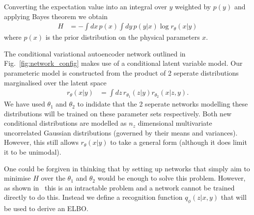 \documentclass[%
showpacs,
 amsmath,amssymb,
 aps,
 twocolumn,
 prl,
 reprint,
floatfix,
]{revtex4-1}
\begin{document}
Converting the expectation value into an integral over $y$ weighted by $p(y)$
and applying Bayes theorem we obtain
%
\begin{align}\label{eq:cost1}
H &= -\int dx\,p(x)\int dy\,p(y|x)\log r_{\theta}(x|y)
\end{align}
%
where $p(x)$ is the prior distribution on the physical parameters $x$.

The conditional variational autoencoder network outlined in
Fig.~\ref{fig:network_config} makes use of a conditional latent variable model.
Our parameteric model is constructed from the product of 2 seperate
distributions marginalised over the latent space
%
\begin{align}\label{eq:latent_model}
r_{\theta}(x|y) &= \int dz\,r_{\theta_{1}}(z|y)r_{\theta_{2}}(x|z,y).
\end{align}
%  
We have used $\theta_{1}$ and $\theta_{2}$ to indidate that the 2 seperate
networks modelling these distributions will be trained on these parameter sets
respectively. Both new conditional distributions are modelled as $n_{z}$
dimensional multivariate uncorrelated Gaussian distributions (governed by their
means and variances). However, this still allows $r_{\theta}(x|y)$ to take a
general form (although it does limit it to be unimodal).  

One could be forgiven in thinking that by setting up networks that simply aim
to minimise $H$ over the $\theta_{1}$ and $\theta_{2}$ would be enough to solve
this problem. However, as shown in~\cite{NIPS2015_5775} this is an intractable
problem and a network cannot be trained directly to do this. Instead we define
a recognition function $q_{\phi}(z|x,y)$ that will be used to derive an
\ac{ELBO}.
\end{document}
